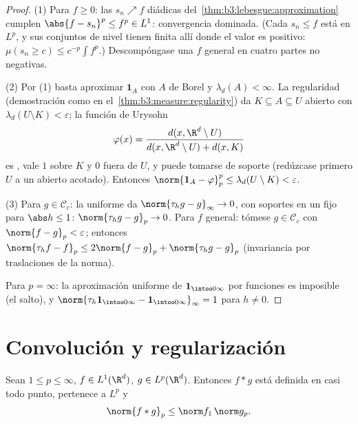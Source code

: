 \begin{proof}
(1) Para $f \geq 0$: las $s_n \nearrow f$ diádicas
del~\cref{thm:b3:lebesgue:approximation} cumplen $\abs{f - s_n}^p
\leq f^p \in L^1$: convergencia dominada. (Cada $s_n \leq f$ está en
$L^p$, y sus conjuntos de nivel tienen
 finita allí donde el valor es
positivo: $\mu(s_n \geq c) \leq c^{-p}\int f^p$.) Descompóngase una $f$
general en cuatro partes no negativas.

(2) Por (1) basta aproximar $\mathbf 1_A$ con $A$ de Borel y
$\lambda_d(A) < \infty$. La regularidad (demostración como en
el~\cref{thm:b3:measure:regularity}) da
 $K \subseteq A
\subseteq U$ abierto con $\lambda_d(U\setminus K) <
\varepsilon$; la función de Urysohn
\[
\varphi(x) = \frac{d(x, \R^d\setminus U)}{d(x, \R^d\setminus U)
+ d(x, K)}
\]
es , vale $1$ sobre $K$ y
$0$ fuera de $U$, y puede tomarse de soporte  (redúzcase primero
$U$ a un abierto acotado). Entonces
$\norm{\mathbf 1_A - \varphi}_p^p \leq \lambda_d(U\setminus K)
< \varepsilon$.

(3) Para $g \in \mathcal C_c$: la
 uniforme da
$\norm{\tau_hg - g}_\infty \to 0$, con soportes en un
 fijo para $\abs h \leq 1$:
$\norm{\tau_hg - g}_p \to 0$. Para $f$ general: tómese
$g \in \mathcal C_c$ con $\norm{f - g}_p <
\varepsilon$; entonces $\norm{\tau_hf - f}_p \leq 2\norm{f - g}_p +
\norm{\tau_hg - g}_p$ (invariancia por traslaciones de la norma).

Para $p = \infty$: la aproximación uniforme de $\mathbf
1_{\intoo0\infty}$ por funciones
 es imposible (el salto),
y $\norm{\tau_h\mathbf 1_{\intoo0\infty} - \mathbf
1_{\intoo0\infty}}_\infty = 1$ para $h \neq 0$.
\end{proof}

\section{Convolución y regularización}

\begin{theorem}\label{thm:b3:lp:young}
Sean $1 \leq p \leq \infty$, $f \in L^1(\R^d)$, $g \in
L^p(\R^d)$. Entonces $f * g$ está definida en casi todo punto, pertenece
a $L^p$ y
\[
\norm{f * g}_p \leq \norm f_1\,\norm g_p .
\]
\end{theorem}

